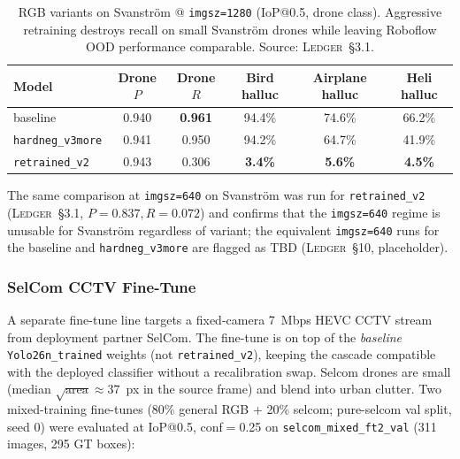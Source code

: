 \begin{table}[htbp]
    \centering
    \caption{RGB variants on Svanstr\"om @ \texttt{imgsz=1280} (IoP@0.5, drone class). Aggressive retraining destroys recall on small Svanstr\"om drones while leaving Roboflow OOD performance comparable. Source: \textsc{Ledger}~\S3.1.}
    \label{tab:rgb_comparison}
    \begin{tabular}{lccccc}
        \toprule
        Model & Drone $P$ & Drone $R$ & Bird halluc & Airplane halluc & Heli halluc \\
        \midrule
        baseline           & 0.940 & \textbf{0.961} & 94.4\% & 74.6\% & 66.2\% \\
        \texttt{hardneg\_v3more}  & 0.941 & 0.950 & 94.2\% & 64.7\% & 41.9\% \\
        \texttt{retrained\_v2}    & 0.943 & 0.306 & \textbf{3.4\%}  & \textbf{5.6\%}  & \textbf{4.5\%}  \\
        \bottomrule
    \end{tabular}
\end{table}

The same comparison at \texttt{imgsz=640} on Svanstr\"om was run for \texttt{retrained\_v2} (\textsc{Ledger}~\S3.1, $P=0.837, R=0.072$) and confirms that the \texttt{imgsz=640} regime is unusable for Svanstr\"om regardless of variant; the equivalent \texttt{imgsz=640} runs for the baseline and \texttt{hardneg\_v3more} are flagged as TBD (\textsc{Ledger}~\S10, placeholder).

\subsubsection{SelCom CCTV Fine-Tune}
\label{sec:selcom_finetune}

A separate fine-tune line targets a fixed-camera 7~Mbps HEVC CCTV stream from deployment partner SelCom. The fine-tune is on top of the \emph{baseline} \texttt{Yolo26n\_trained} weights (not \texttt{retrained\_v2}), keeping the cascade compatible with the deployed classifier without a recalibration swap. Selcom drones are small (median $\sqrt{\text{area}} \approx 37$~px in the source frame) and blend into urban clutter. Two mixed-training fine-tunes (80\% general RGB + 20\% selcom; pure-selcom val split, seed 0) were evaluated at IoP@0.5, conf$=$0.25 on \texttt{selcom\_mixed\_ft2\_val} (311 images, 295 GT boxes):

